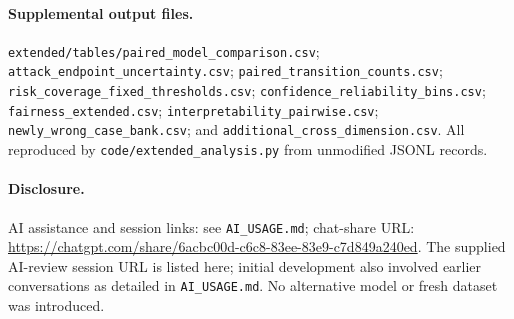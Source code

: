 \documentclass[11pt]{article}
\begin{document}
\paragraph{Supplemental output files.} \texttt{extended/tables/paired\_model\_comparison.csv}; \texttt{attack\_endpoint\_uncertainty.csv}; \texttt{paired\_transition\_counts.csv}; \texttt{risk\_coverage\_fixed\_thresholds.csv}; \texttt{confidence\_reliability\_bins.csv}; \texttt{fairness\_extended.csv}; \texttt{interpretability\_pairwise.csv}; \texttt{newly\_wrong\_case\_bank.csv}; and \texttt{additional\_cross\_dimension.csv}. All reproduced by \texttt{code/extended\_analysis.py} from unmodified JSONL records.
\paragraph{Disclosure.} AI assistance and session links: see \texttt{AI\_USAGE.md}; chat-share URL: \url{https://chatgpt.com/share/6acbc00d-c6c8-83ee-83e9-c7d849a240ed}. The supplied AI-review session URL is listed here; initial development also involved earlier conversations as detailed in \texttt{AI\_USAGE.md}. No alternative model or fresh dataset was introduced.
\end{document}
